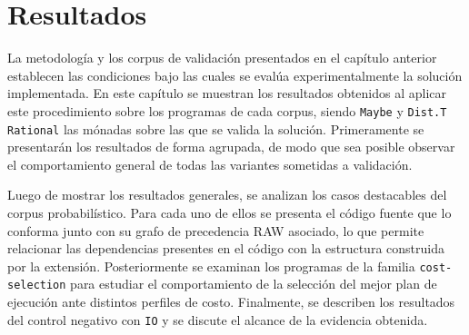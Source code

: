 
\chapter{Resultados}
\label{chap:resultados}

La metodología y los corpus de validación presentados en el capítulo anterior establecen las condiciones bajo las cuales se evalúa experimentalmente la solución implementada. En este capítulo se muestran los resultados obtenidos al aplicar este procedimiento sobre los programas de cada corpus, siendo \texttt{Maybe} y \texttt{Dist.T Rational} las mónadas sobre las que se valida la solución. Primeramente se presentarán los resultados de forma agrupada, de modo que sea posible observar el comportamiento general de todas las variantes sometidas a validación.

Luego de mostrar los resultados generales, se analizan los casos destacables del corpus probabilístico. Para cada uno de ellos se presenta el código fuente que lo conforma junto con su grafo de precedencia RAW asociado, lo que permite relacionar las dependencias presentes en el código con la estructura construida por la extensión. Posteriormente se examinan los programas de la familia \texttt{cost-selection} para estudiar el comportamiento de la selección del mejor plan de ejecución ante distintos perfiles de costo. Finalmente, se describen los resultados del control negativo con \texttt{IO} y se discute el alcance de la evidencia obtenida.






